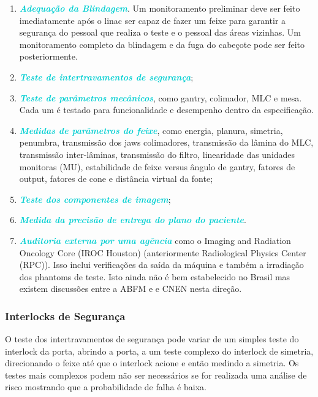 \documentclass[11pt,a4paper]{article}
\begin{document}
	\begin{enumerate}
		\item \textcolor{DarkTurquoise}{\textbf{\textit{Adequação da Blindagem}}}. Um monitoramento preliminar deve ser feito imediatamente após o linac ser capaz de fazer um feixe para garantir a segurança do pessoal que realiza o teste e o pessoal das áreas vizinhas. Um monitoramento completo da blindagem e da fuga do cabeçote pode ser feito posteriormente.
		\item \textcolor{DarkTurquoise}{\textbf{\textit{Teste de intertravamentos de segurança}}};
		\item \textcolor{DarkTurquoise}{\textbf{\textit{Teste de parâmetros mecânicos}}}, como gantry, colimador, MLC e mesa. Cada um é testado para funcionalidade e desempenho dentro da especificação.
		\item \textcolor{DarkTurquoise}{\textbf{\textit{Medidas de parâmetros do feixe}}}, como energia, planura, simetria, penumbra, transmissão dos jaws colimadores, transmissão da lâmina do MLC, transmissão inter-lâminas, transmissão do filtro, linearidade das unidades monitoras (MU), estabilidade de feixe versus ângulo de gantry, fatores de output, fatores de cone e  distância virtual da fonte;
		\item \textcolor{DarkTurquoise}{\textbf{\textit{Teste dos componentes de imagem}}};
		\item \textcolor{DarkTurquoise}{\textbf{\textit{Medida da precisão de entrega do plano do paciente}}}.
		\item \textcolor{DarkTurquoise}{\textbf{\textit{Auditoria externa por uma agência}}} como o Imaging and Radiation Oncology Core (IROC Houston) (anteriormente Radiological Physics Center (RPC)). Isso inclui verificações da saída da máquina e também a irradiação dos phantoms de teste. Isto ainda não é bem estabelecido no Brasil mas existem discussões entre a ABFM e e CNEN nesta direção.
	\end{enumerate}

\subsubsection*{Interlocks de Segurança}

	O teste dos intertravamentos de segurança pode variar de um simples teste do interlock da porta, abrindo a porta, a um teste complexo do interlock de simetria, direcionando o feixe até que o interlock acione e então medindo a simetria. Os testes mais complexos podem não ser necessários se for realizada uma análise de risco mostrando que a probabilidade de falha é baixa.
\end{document}
